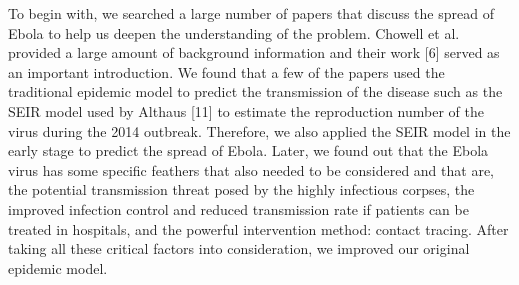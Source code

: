 \documentclass{mcmthesis}
\begin{document}
To begin with, we searched a large number of papers that discuss the spread of
Ebola to help us deepen the understanding of the problem. Chowell et al. provided a
large amount of background information and their work [6] served as an important
introduction. We found that a few of the papers used the traditional epidemic model to
predict the transmission of the disease such as the SEIR model used by Althaus [11] to
estimate the reproduction number of the virus\cite{bib1,bib2} during the 2014 outbreak. Therefore, we
also applied the SEIR model in the early stage to predict the spread of Ebola. Later, we
found out that the Ebola virus has some specific feathers that also needed to be
considered and that are, the potential transmission threat posed by the highly infectious
corpses, the improved infection control and reduced transmission rate if patients can be
treated in hospitals, and the powerful intervention method: contact tracing. After taking
all these critical factors into consideration, we improved our original epidemic model.
\end{document}
